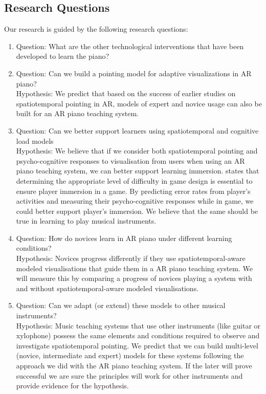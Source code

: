 \documentclass[manuscript,screen]{acmart}
\begin{document}
\subsection{Research Questions}
Our research is guided by the following research questions: 
\begin{enumerate}
    \item Question: What are the other technological interventions that have been developed to learn the piano? 
    \item Question: Can we build a pointing model for adaptive visualizations in AR piano? \\
    Hypothesis: We predict that based on the success of earlier studies on spatiotemporal pointing in AR, models of expert and novice usage can also be built for an AR piano teaching system. 
    \item Question: Can we better support learners using spatiotemporal and cognitive load models\\
    Hypothesis: We believe that if we consider both spatiotemporal pointing and psycho-cognitive responses to visualisation from users when using an AR piano teaching system, we can better support learning immersion.  \citet{lee2016website} states that determining the appropriate level of difficulty in game design is essential to ensure player immersion in a game. By predicting error rates from player’s activities and measuring their psycho-cognitive responses while in game, we could better support player’s immersion. We believe that the same should be true in learning to play musical instruments.
    \item Question: How do novices learn in AR piano under different learning conditions?\\
    Hypothesis: Novices progress differently if they use spatiotemporal-aware modeled visualisations that guide them in a AR piano teaching system. We will measure this by comparing a progress of novices playing a system with and without  spatiotemporal-aware modeled visualisations.
    \item Question: Can we adapt (or extend) these models to other musical instruments?\\
    Hypothesis: Music teaching systems that use other instruments (like guitar or xylophone) possess the same elements and conditions required to observe and investigate spatiotemporal pointing. We predict that we can build multi-level (novice, intermediate and expert) models for these systems following the approach we did with the AR piano teaching system. If the later will prove successful we are sure the principles will work for other instruments and provide evidence for the hypothesis. 
\end{enumerate}
\end{document}

